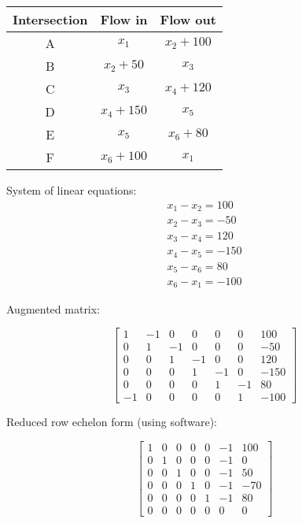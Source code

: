 \documentclass[12pt, a4paper]{article}
\begin{document}
\begin{table}[h!]
    \begin{tabular}{c c c}
   \hline
    \textbf{Intersection} & \textbf{Flow in} & \textbf{Flow out} \\
    \hline
    A & $x_1$ & $x_2+100$ \\
   B & $x_2+50$ & $x_3$ \\
   C & $x_3$ & $x_4+120$  \\
   D & $x_4+150$ & $x_5$ \\
   E & $x_5$ & $x_6+80$ \\
   F & $x_6+100$ & $x_1$ \\
   \hline
    \end{tabular}
\end{table}

System of linear equations:
\[
    \begin{aligned}
        x_1 - x_2 = 100 \\
        x_2 - x_3 = -50 \\
        x_3 - x_4 = 120 \\
        x_4 - x_5 = -150 \\
        x_5 - x_6 = 80 \\
        x_6 - x_1 = -100
    \end{aligned}
\]

Augmented matrix:

\[
    \begin{bmatrix}
        1 & -1 & 0 & 0 & 0 & 0 & 100 \\
        0 & 1 & -1 & 0 & 0 & 0 & -50 \\
        0 & 0 & 1 & -1 & 0 & 0 & 120 \\
        0 & 0 & 0 & 1 & -1 & 0 & -150 \\
        0 & 0 & 0 & 0 & 1 & -1 & 80 \\
        -1 & 0 & 0 & 0 & 0 & 1 & -100
    \end{bmatrix}
\]

Reduced row echelon form (using software):


\[
    \begin{bmatrix}
        1 & 0 & 0 & 0 & 0 & -1 & 100 \\
        0 & 1 & 0 & 0 & 0 & -1 & 0 \\
        0 & 0 & 1 & 0 & 0 & -1 & 50 \\
        0 & 0 & 0 & 1 & 0 & -1 & -70 \\
        0 & 0 & 0 & 0 & 1 & -1 & 80 \\
        0 & 0 & 0 & 0 & 0 & 0 & 0
    \end{bmatrix}
\]
\end{document}
